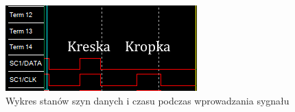 \documentclass[12pt,a4paper,table]{article}
\begin{document}
    \begin{figure}[h]
        \centering
        \includegraphics[width=0.3\linewidth]{images/q_input_plot.PNG}
        \caption{Wykres stanów szyn danych i czasu podczas wprowadzania
        sygnału}
        \label{fig:q_idea_plot}
    \end{figure}
\end{document}
